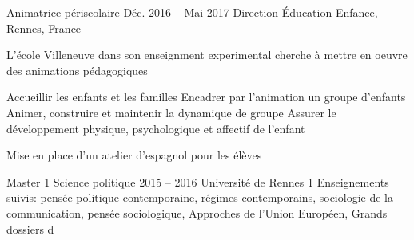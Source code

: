 










\begin{coordinatelist}
\end{coordinatelist}



\begin{joblist}



\item[Animatrice périscolaire]{Déc. 2016 -- Mai 2017 }     
  	{Direction Éducation Enfance, Rennes, France}     
	{
		 L'école Villeneuve dans son enseignment experimental cherche à mettre en oeuvre des animations pédagogiques   \\
		  
		\begin{itemize}
			  \cvitem[\checkmark] Accueillir les enfants et les familles
			  \cvitem[\checkmark] Encadrer par l’animation un groupe d’enfants
			  \cvitem[\checkmark] Animer, construire et maintenir la dynamique de groupe
			  \cvitem[\checkmark] Assurer le développement physique, psychologique et affectif de l’enfant
		\end{itemize}        

		 Mise en place d'un atelier d'espagnol pour les élèves
	}
	
\end{joblist}


\begin{yearlist}
\item[Master 1 Science politique]{2015 -- 2016}
     {Université de Rennes 1}
     {Enseignements suivis: pensée politi\-que contemporaine,
     régimes contemporains, sociologie de la communication, pensée sociologique,
     Appro\-ches de l'Union Européen, Grands dossiers d}
\end{yearlist}



